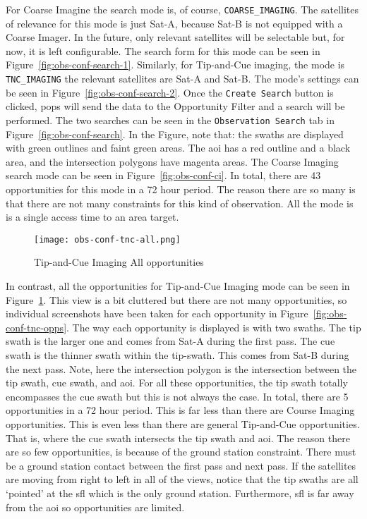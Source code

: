 For Coarse Imagine the search mode is, of course, \texttt{COARSE\_IMAGING}.
The satellites of relevance for this mode is just Sat-A, because Sat-B is not
equipped with a Coarse Imager. In the future, only relevant satellites will be
selectable but, for now, it is left configurable.  The search form for this
mode can be seen in Figure~\ref{fig:obs-conf-search-1}. Similarly, for
Tip-and-Cue imaging, the mode is \texttt{TNC\_IMAGING} the relevant satellites
are Sat-A and Sat-B.  The mode's settings can be seen in
Figure~\ref{fig:obs-conf-search-2}. Once the \texttt{Create Search} button is
clicked, \gls{pops} will send the data to the Opportunity Filter and a search
will be performed. The two searches can be seen in the \texttt{Observation
Search} tab in Figure~\ref{fig:obs-conf-search}. In the Figure, note that: the
swaths are displayed with green outlines and faint green areas. The \gls{aoi}
has a red outline and a black area, and the intersection polygons have magenta
areas. The Coarse Imaging search mode can be seen in
Figure~\ref{fig:obs-conf-ci}. In total,
there are 43 opportunities for this mode in a 72 hour period. The reason there
are so many is that there are not many constraints for this kind of
observation. All the mode is is a single access time to an area target. 

\begin{figure}[h]
    \centering
    \texttt{[image: obs-conf-tnc-all.png]} 
    \caption{Tip-and-Cue Imaging All opportunities}
    \label{fig:obs-conf-tnc-all} 
\end{figure}

In contrast, all the opportunities for Tip-and-Cue Imaging mode can be seen in
Figure~\ref{fig:obs-conf-tnc-all}. This view is a bit cluttered but there are
not many opportunities, so individual screenshots have been taken for each
opportunity in Figure~\ref{fig:obs-conf-tnc-opps}. The way each opportunity is
displayed is with two swaths.  The tip swath is the larger one and comes from
Sat-A during the first pass. The cue swath is the thinner swath within the
tip-swath. This comes from Sat-B during the next pass. Note, here the
intersection polygon is the intersection between the tip swath, cue swath, and
\gls{aoi}. For all these opportunities, the tip swath totally encompasses the
cue swath but this is not always the case. In total, there are 5 opportunities
in a 72 hour period. This is far less than there are Course Imaging
opportunities. This is even less than there are general Tip-and-Cue
opportunities. That is, where the cue swath intersects the tip swath and
\gls{aoi}. The reason there are so few opportunities, is because of the ground
station constraint. There must be a ground station contact between the first
pass and next pass. If the satellites are moving from right to left in all of
the views, notice that the tip swaths are all `pointed' at the \gls{sfl} which
is the only ground station. Furthermore, \gls{sfl} is far away from the
\gls{aoi} so opportunities are limited.


